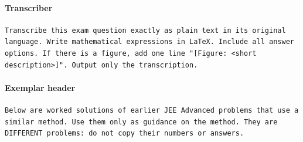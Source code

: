 \paragraph{Transcriber}
\begin{small}\begin{verbatim}
Transcribe this exam question exactly as plain text in its original
language. Write mathematical expressions in LaTeX. Include all answer
options. If there is a figure, add one line "[Figure: <short
description>]". Output only the transcription.
\end{verbatim}\end{small}

\paragraph{Exemplar header}
\begin{small}\begin{verbatim}
Below are worked solutions of earlier JEE Advanced problems that use a
similar method. Use them only as guidance on the method. They are
DIFFERENT problems: do not copy their numbers or answers.
\end{verbatim}\end{small}
